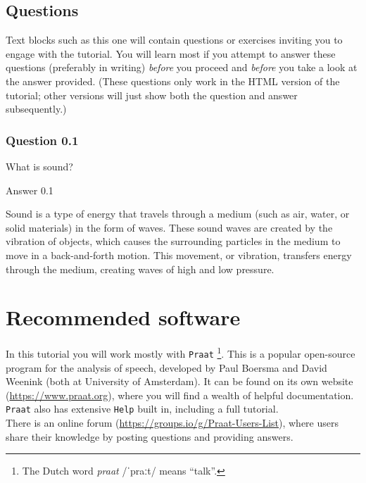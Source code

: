 \documentclass[
]{book}
\begin{document}
\label{question-intro}
\subsection*{Questions}\label{questions}

Text blocks such as this one will contain questions or exercises inviting you to engage with the tutorial. You will learn most if you attempt to answer these questions (preferably in writing) \emph{before} you proceed and \emph{before} you take a look at the answer provided. (These questions only work in the HTML version of the tutorial; other versions will just show both the question and answer subsequently.)

\subsubsection*{Question 0.1}\label{question-0.1}

What is sound?

Answer 0.1

Sound is a type of energy that travels through a medium (such as air, water, or solid materials) in the form of waves. These sound waves are created by the vibration of objects, which causes the surrounding particles in the medium to move in a back-and-forth motion. This movement, or vibration, transfers energy through the medium, creating waves of high and low pressure.

\section*{Recommended software}\label{recommended-software}

In this tutorial you will work mostly with \texttt{Praat} \citep{Boersma_Weenink_2024}\footnote{The Dutch word \emph{praat} /ˈpraːt/ means ``talk''.}. This is a popular open-source program for the analysis of speech, developed by Paul Boersma and David Weenink (both at University of Amsterdam). It can be found on its own website (\url{https://www.praat.org}), where you will find a wealth of helpful documentation. \texttt{Praat} also has extensive \texttt{Help} built in, including a full tutorial.\\
There is an online forum (\url{https://groups.io/g/Praat-Users-List}), where users share their knowledge by posting questions and providing answers.
\end{document}
